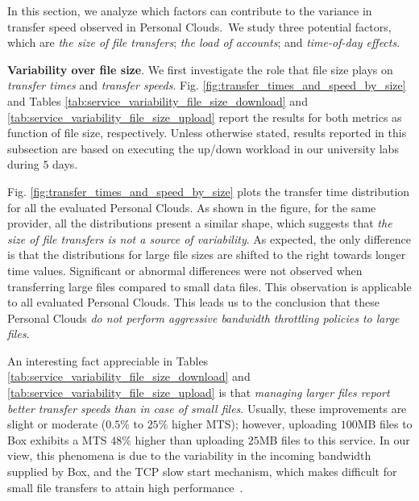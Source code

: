 In this section, we analyze which factors can contribute to the
variance in transfer speed observed in Personal Clouds.~We
study three potential factors, which are \textit{the size of file transfers};
\textit{the load of accounts}; and \textit{time-of-day effects}.
\medskip

\noindent\textbf{Variability over file size}. We first investigate the role that 
file size plays on \textit{transfer times} 
and \textit{transfer speeds}. Fig. \ref{fig:transfer_times_and_speed_by_size}
and Tables \ref{tab:service_variability_file_size_download} and \ref{tab:service_variability_file_size_upload} report the results
for both metrics as function of file size, respectively. Unless otherwise
stated, results reported in this subsection are based on executing the 
up/down workload in our university labs during $5$ days.  

Fig. \ref{fig:transfer_times_and_speed_by_size} plots the
transfer time distribution for all the evaluated
Personal Clouds. As shown in the figure, for
the same provider, all the distributions present a similar
shape, which suggests that \textit{the size of file transfers is not a 
source of variability}. As expected, the only difference is that
the distributions for large file sizes are shifted to the right towards
longer time values. Significant or abnormal differences were not observed
when transferring large files compared to small data files. This observation is applicable to all evaluated Personal Clouds. 
This leads us to the conclusion that these Personal Clouds
\textit{do not perform aggressive bandwidth throttling policies to large files}.

An interesting fact appreciable in Tables \ref{tab:service_variability_file_size_download} and \ref{tab:service_variability_file_size_upload}
is that \textit{managing larger files report better transfer 
speeds than in case of small files}. Usually, these 
improvements are slight or moderate ($0.5\%$ to $25\%$ higher MTS); 
however, uploading $100$MB files to Box exhibits a MTS $48\%$ higher
than uploading $25$MB files to this service. In our view, this phenomena is due
to the variability in the incoming bandwidth supplied by Box, and 
the TCP slow start mechanism, which makes difficult for small file transfers 
to attain high performance~\cite{allman1999tcp}. 

